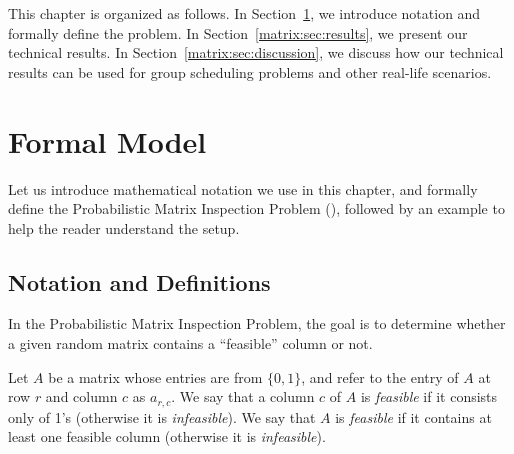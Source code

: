 This chapter is organized as follows.
In Section~\ref{matrix:sec:model}, we introduce notation and formally define the problem. 
In Section~\ref{matrix:sec:results}, we present our technical results.
In Section~\ref{matrix:sec:discussion}, we discuss how our technical results can be used for group scheduling problems and other real-life scenarios. 





\section{Formal Model} \label{matrix:sec:model}

Let us introduce mathematical notation we use in this chapter, and formally define the Probabilistic Matrix Inspection Problem (\PMIP), followed by an example to help the reader understand the setup.


\subsection{Notation and Definitions}

In the Probabilistic Matrix Inspection Problem, the goal is to determine whether a given random matrix contains a ``feasible'' column or not. 

 \begin{definition}[Feasibility]
 Let $A$ be a matrix whose entries are from $\{0,1\}$, and refer to the entry of $A$ at row $r$ and column $c$ as $a_{r,c}$.
 We say that a column $c$ of $A$ is {\em feasible} if it consists only of 1's (otherwise it is {\em infeasible}). 
 We say that $A$ is {\em feasible} if it contains at least one feasible column (otherwise it is {\em infeasible}).
 \end{definition}

